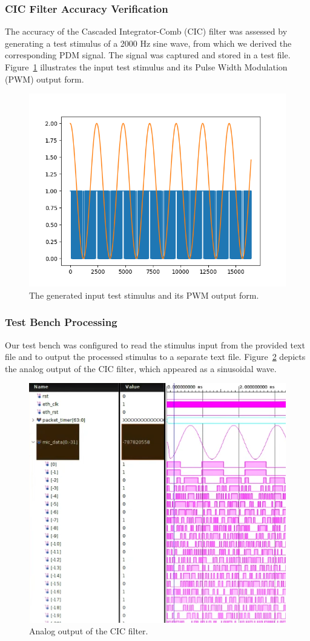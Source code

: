 \subsubsection{CIC Filter Accuracy Verification}
The accuracy of the Cascaded Integrator-Comb (CIC) filter was assessed by generating a test stimulus of a 2000 Hz sine wave, from which we derived the corresponding PDM signal. The signal was captured and stored in a test file. Figure~\ref{fig:test_stimulus_pwm_output} illustrates the input test stimulus and its Pulse Width Modulation (PWM) output form. 

\begin{figure}[h!]
\centering
\includegraphics[width=.4\linewidth]{Sections/RESULTS/Images/PDM-Stim.png}
\caption{The generated input test stimulus and its PWM output form.}
\label{fig:test_stimulus_pwm_output}
\end{figure}

\subsubsection{Test Bench Processing}
Our test bench was configured to read the stimulus input from the provided text file and to output the processed stimulus to a separate text file. Figure~\ref{fig:cic_analog_output} depicts the analog output of the CIC filter, which appeared as a sinusoidal wave.


\begin{figure}[h!]
\centering
\includegraphics[width=.4\linewidth]{Sections/RESULTS/Images/verilog-tb-pdm-stim.png}
\caption{Analog output of the CIC filter.}
\label{fig:cic_analog_output}
\end{figure}

